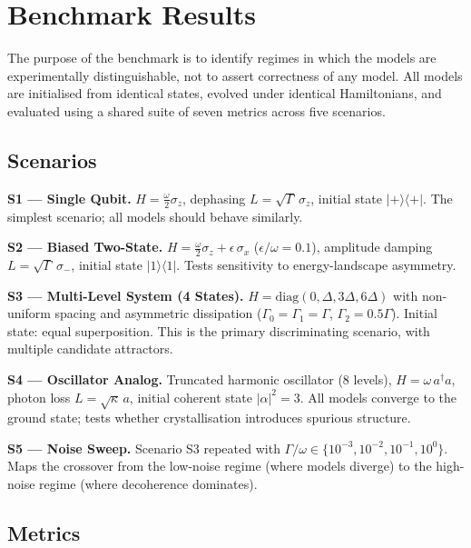 \documentclass[12pt]{article}
\begin{document}
\section{Benchmark Results}
\label{sec:benchmark}

The purpose of the benchmark is to identify regimes in which the models are experimentally distinguishable, not to assert correctness of any model. All models are initialised from identical states, evolved under identical Hamiltonians, and evaluated using a shared suite of seven metrics across five scenarios.

\subsection{Scenarios}

\textbf{S1 --- Single Qubit.} $H = \frac{\omega}{2}\sigma_z$, dephasing $L = \sqrt{\Gamma}\,\sigma_z$, initial state $|{+}\rangle\langle{+}|$. The simplest scenario; all models should behave similarly.

\textbf{S2 --- Biased Two-State.} $H = \frac{\omega}{2}\sigma_z + \epsilon\,\sigma_x$ ($\epsilon/\omega = 0.1$), amplitude damping $L = \sqrt{\Gamma}\,\sigma_-$, initial state $|1\rangle\langle 1|$. Tests sensitivity to energy-landscape asymmetry.

\textbf{S3 --- Multi-Level System (4 States).} $H = \mathrm{diag}(0, \Delta, 3\Delta, 6\Delta)$ with non-uniform spacing and asymmetric dissipation ($\Gamma_0 = \Gamma_1 = \Gamma$, $\Gamma_2 = 0.5\Gamma$). Initial state: equal superposition. This is the primary discriminating scenario, with multiple candidate attractors.

\textbf{S4 --- Oscillator Analog.} Truncated harmonic oscillator (8 levels), $H = \omega\, a^\dagger a$, photon loss $L = \sqrt{\kappa}\,a$, initial coherent state $|\alpha|^2 = 3$. All models converge to the ground state; tests whether crystallisation introduces spurious structure.

\textbf{S5 --- Noise Sweep.} Scenario S3 repeated with $\Gamma/\omega \in \{10^{-3}, 10^{-2}, 10^{-1}, 10^{0}\}$. Maps the crossover from the low-noise regime (where models diverge) to the high-noise regime (where decoherence dominates).

\subsection{Metrics}
\end{document}
